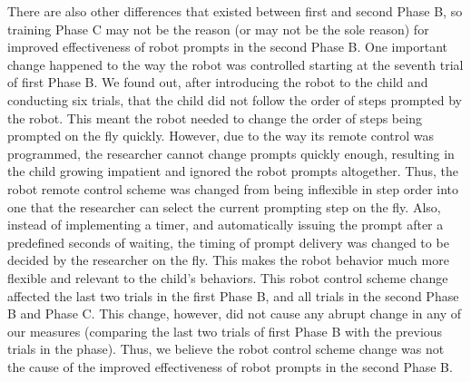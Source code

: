 \documentclass{ut-thesis}
\begin{document}
There are also other differences that existed between first and second Phase B, so training Phase C may not be the reason (or may not be the sole reason) for improved effectiveness of robot prompts in the second Phase B.  One important change happened to the way the robot was controlled starting at the seventh trial of first Phase B.  We found out, after introducing the robot to the child and conducting six trials, that the child did not follow the order of steps prompted by the robot.  This meant the robot needed to change the order of steps being prompted on the fly quickly.  However, due to the way its remote control was programmed, the researcher cannot change prompts quickly enough, resulting in the child growing impatient and ignored the robot prompts altogether.  Thus, the robot remote control scheme was changed from being inflexible in step order into one that the researcher can select the current prompting step on the fly.  Also, instead of implementing a timer, and automatically issuing the prompt after a predefined seconds of waiting, the timing of prompt delivery was changed to be decided by the researcher on the fly.  This makes the robot behavior much more flexible and relevant to the child's behaviors.  This robot control scheme change affected the last two trials in the first Phase B, and all trials in the second Phase B and Phase C.  This change, however, did not cause any abrupt change in any of our measures (comparing the last two trials of first Phase B with the previous trials in the phase).  Thus, we believe the robot control scheme change was not the cause of the improved effectiveness of robot prompts in the second Phase B.
\end{document}
